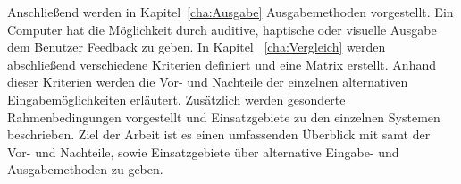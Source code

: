 \newline \newline \newline
Anschließend werden in Kapitel~\ref{cha:Ausgabe} Ausgabemethoden vorgestellt. Ein Computer hat die Möglichkeit durch auditive, haptische oder visuelle Ausgabe dem Benutzer Feedback zu geben.
\newline \newline
In Kapitel ~\ref{cha:Vergleich} werden abschließend verschiedene Kriterien definiert und eine Matrix erstellt. Anhand dieser Kriterien werden die Vor- und Nachteile der einzelnen alternativen Eingabemöglichkeiten erläutert. Zusätzlich werden gesonderte Rahmenbedingungen vorgestellt und Einsatzgebiete zu den einzelnen Systemen beschrieben.
\newline \newline
Ziel der Arbeit ist es einen umfassenden Überblick mit samt der Vor- und Nachteile, sowie Einsatzgebiete über alternative Eingabe- und Ausgabemethoden zu geben.